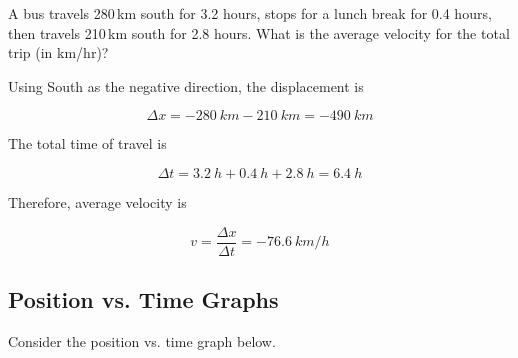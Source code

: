 \documentclass[answers]{exam}
\begin{document}
\begin{questions}

\question
A bus travels 280\,km south for 3.2 hours, stops for a lunch break for 0.4 hours, then travels 210\,km south for 2.8 hours. What is the average velocity for the total trip (in km/hr)?

\begin{solution}
    Using South as the negative direction, the displacement is
    
    \begin{equation*}
        \Delta x = -\SI{280}{km} - \SI{210}{km} = \SI{-490}{km}
    \end{equation*}

    The total time of travel is

    \begin{equation*}
        \Delta t = \SI{3.2}{h} + \SI{0.4}{h} + \SI{2.8}{h} = \SI{6.4}{h}
    \end{equation*}

    Therefore, average velocity is

    \begin{equation*}
        v = \frac{\Delta x}{\Delta t} = \boxed{\SI{-76.6}{km/h}}
    \end{equation*}
\end{solution}

\clearpage
\begin{EnvUplevel}
    \subsection{Position vs. Time Graphs}
\end{EnvUplevel}





\question 
Consider the position vs. time graph below. 

\begin{center}
\end{center}


\end{questions}
\end{document}
